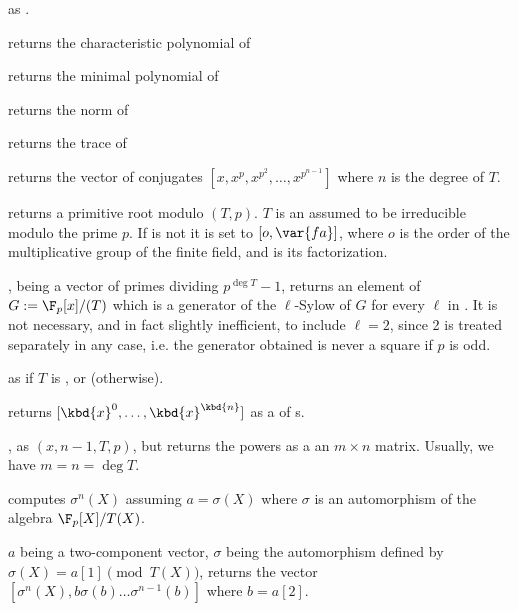 as .

 returns the characteristic
polynomial of 

 returns the minimal polynomial
of 

 returns the norm of 

 returns the trace of 

 returns the vector of conjugates
$[x,x^p,x^{p^2},\ldots,x^{p^{n-1}}]$ where $n$ is the degree of $T$.

 returns a primitive root modulo
$(T,p)$. $T$ is an  assumed to be irreducible modulo the prime
$p$. If  is not  it is set to $[o,\var{fa}]$, where $o$ is
the order of the multiplicative group of the finite field, and  is
its factorization.

,  being a vector of
primes dividing $p^{\deg T} - 1$, returns an element of $G:=\F_p[x]/(T)$
which is a generator of the $\ell$-Sylow of $G$ for every $\ell$ in
. It is not necessary, and in fact slightly inefficient, to include
$\ell=2$, since 2 is treated separately in any case, i.e. the generator
obtained is never a square if $p$ is odd.

 as
 if $T$ is ,
or  (otherwise).


 returns $[\kbd{x}^0,
\dots, \kbd{x}^\kbd{n}]$ as a  of s.

, as
$(x, n-1, T, p)$, but returns the powers as a an
$m\times n$ matrix. Usually, we have $m = n = \deg T$.

 computes $\sigma^n(X)$
assuming $a=\sigma(X)$ where $\sigma$ is an automorphism of the algebra
$\F_p[X]/T(X)$.

$a$ being a two-component vector,
$\sigma$ being the automorphism defined by $\sigma(X)=a[1]\pmod{T(X)}$,
returns the vector $[\sigma^n(X),b\sigma(b)\ldots\sigma^{n-1}(b)]$
where $b=a[2]$.

